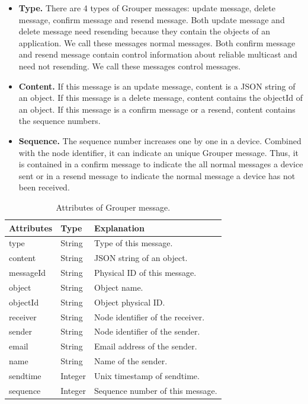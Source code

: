 \documentclass[twocolumn,10pt]{article}
\begin{document}
\begin{itemize}
	\setlength{\itemsep}{1pt}
	\setlength{\parskip}{0pt}
	\setlength{\parsep}{0pt}
	\item \textbf{Type.}
	There are 4 types of Grouper messages: update message, delete message, confirm message and resend message. 
	Both update message and delete message need resending because they contain the objects of an application. 
	We call these messages normal messages. 
	Both confirm message and resend message contain control information about reliable multicast and need not resending. 
	We call these messages control messages.
	\item \textbf{Content.} 
	If this message is an update message, content is a JSON string of an object.
	If this message is a delete message, content contains the objectId of an object.
	If this message is a confirm message or a resend, content contains the sequence numbers.
	\item \textbf{Sequence.}
	The sequence number increases one by one in a device.
	Combined with the node identifier, it can indicate an unique Grouper message.
	Thus, it is contained in a confirm message to indicate the all normal messages a device sent or in a resend message to indicate the normal message a device has not been received.
\end{itemize}

\begin{table}[t]
	\centering
	\caption{Attributes of Grouper message.}
	\label{my-label}
	\begin{tabular}{lll}
		\hline
		\textbf{Attributes} & \textbf{Type} & \textbf{Explanation} \\ \hline
		type & String & Type of this message. \\
		content & String & JSON string of an object. \\
		messageId & String & Physical ID of this message. \\
		object & String & Object name. \\
		objectId & String & Object physical ID. \\
		receiver & String & Node identifier of the receiver. \\
		sender & String & Node identifier of the sender. \\
		email & String & Email address of the sender. \\
		name & String & Name of the sender. \\
		sendtime & Integer & Unix timestamp of sendtime. \\
		sequence & Integer & Sequence number of this message. \\ \hline
	\end{tabular}
\end{table}
\end{document}
